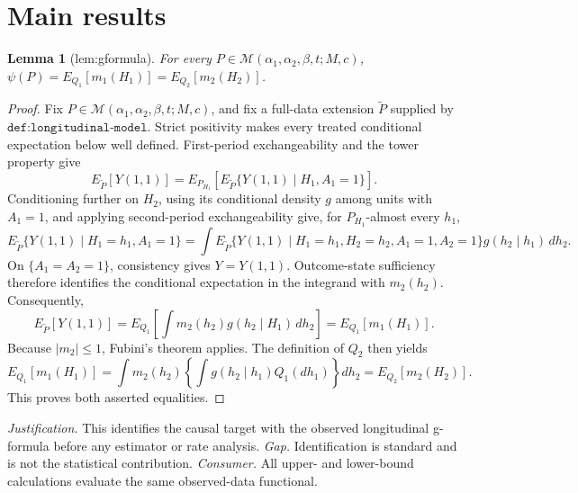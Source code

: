 \documentclass{article}
\newtheorem{lemma}{Lemma}
\begin{document}
\section{Main results}

\begin{lemma}[lem:gformula]\label{lem:gformula}
For every \(P\in\mathcal M(\alpha_1,\alpha_2,\beta,t;M,c)\), \(\psi(P)=E_{Q_1}[m_1(H_1)]=E_{Q_2}[m_2(H_2)]\).
\end{lemma}
\begin{proof}
Fix \(P\in\mathcal M(\alpha_1,\alpha_2,\beta,t;M,c)\), and fix a full-data extension \(\widetilde P\) supplied by \(\texttt{def:longitudinal-model}\). Strict positivity makes every treated conditional expectation below well defined. First-period exchangeability and the tower property give
\[E_{\widetilde P}[Y(1,1)]=E_{P_{H_1}}\!\left[E_{\widetilde P}\{Y(1,1)\mid H_1,A_1=1\}\right].\]
Conditioning further on \(H_2\), using its conditional density \(g\) among units with \(A_1=1\), and applying second-period exchangeability give, for \(P_{H_1}\)-almost every \(h_1\),
\[E_{\widetilde P}\{Y(1,1)\mid H_1=h_1,A_1=1\}=\int E_{\widetilde P}\{Y(1,1)\mid H_1=h_1,H_2=h_2,A_1=1,A_2=1\}g(h_2\mid h_1)\,dh_2.\]
On \(\{A_1=A_2=1\}\), consistency gives \(Y=Y(1,1)\). Outcome-state sufficiency therefore identifies the conditional expectation in the integrand with \(m_2(h_2)\). Consequently,
\[E_{\widetilde P}[Y(1,1)]=E_{Q_1}\!\left[\int m_2(h_2)g(h_2\mid H_1)\,dh_2\right]=E_{Q_1}[m_1(H_1)].\]
Because \(|m_2|\le1\), Fubini's theorem applies. The definition of \(Q_2\) then yields
\[E_{Q_1}[m_1(H_1)]=\int m_2(h_2)\left\{\int g(h_2\mid h_1)Q_1(dh_1)\right\}dh_2=E_{Q_2}[m_2(H_2)].\]
This proves both asserted equalities.
\end{proof}
\par\smallskip\noindent \textit{Justification.} This identifies the causal target with the observed longitudinal g-formula before any estimator or rate analysis. \textit{Gap.} Identification is standard and is not the statistical contribution. \textit{Consumer.} All upper- and lower-bound calculations evaluate the same observed-data functional.
\end{document}
